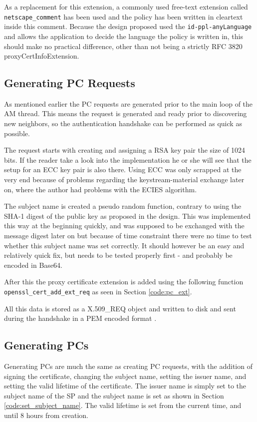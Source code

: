 As a replacement for this extension, a commonly used free-text extension called
\texttt{netscape\_comment} has been used and the policy has been written in
cleartext inside this comment. Because the design proposed used the
\texttt{id-ppl-anyLanguage} and allows the application to decide the language
the policy is written in, this should make no practical difference, other than
not being a strictly RFC 3820 proxyCertInfoExtension.

\subsection{Generating PC Requests}
As mentioned earlier the PC requests are generated prior to the main loop of the
AM thread. This means the request is generated and ready prior to discovering
new neighbors, so the authentication handshake can be performed as quick as
possible.

The request starts with creating and assigning a RSA key pair the size of 1024
bits. If the reader take a look into the implementation he or she will see that
the setup for an \ac{ECC} key pair is also there. Using ECC was only scrapped
at the very end because of problems regarding the keystream-material exchange
later on, where the author had problems with the ECIES algorithm.

The subject name is created a pseudo random function, contrary to using the
SHA-1 digest of the public key as proposed in the design. This was implemented
this way at the beginning quickly, and was supposed to be exchanged with the
message digest later on but because of time constraint there were no time to
test whether this subject name was set correctly. It should however be an easy
and relatively quick fix, but needs to be tested properly first - and probably
be encoded in Base64.

After this the proxy certificate extension is added using the following
function\\\texttt{openssl\_cert\_add\_ext\_req} as seen in Section
\ref{code:pc_ext}.

All this data is stored as a X.509\_REQ object and written to disk and sent
during the handshake in a PEM encoded format \cite{rfc1421}.

\subsection{Generating PCs}
Generating PCs are much the same as creating PC requests, with the addition of
signing the certificate, changing the subject name, setting the issuer name, and
setting the valid lifetime of the certificate. The issuer name is simply set to
the subject name of the \ac{SP} and the subject name is set as shown in Section
\ref{code:set_subject_name}. The valid lifetime is set from the current time,
and until 8 hours from creation.

